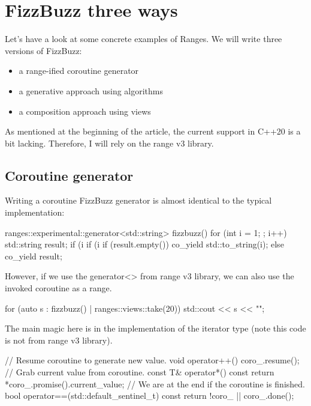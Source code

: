 \section{FizzBuzz three ways}

Let’s have a look at some concrete examples of Ranges. We will write three versions of FizzBuzz:

\begin{itemize}
    \item a range-ified coroutine generator
    \item a generative approach using algorithms
    \item a composition approach using views
\end{itemize}

As mentioned at the beginning of the article, the current support in C++20 is a bit lacking. Therefore, I will rely on the range v3 library.

\subsection{Coroutine generator}

Writing a coroutine FizzBuzz generator is almost identical to the typical implementation:

\begin{box-note}
\begin{cppcode}
ranges::experimental::generator<std::string> fizzbuzz() {
    for (int i = 1; ; i++) {
        std::string result;
        if (i %
        if (i %
        if (result.empty()) co_yield std::to_string(i);
        else co_yield result;
    }
}
\end{cppcode}
\end{box-note}

However, if we use the generator<> from range v3 library, we can also use the invoked coroutine as a range.

\begin{box-note}
\begin{cppcode}
for (auto s : fizzbuzz() | ranges::views::take(20)) {
    std::cout << s << "\n";
}
\end{cppcode}
\end{box-note}

The main magic here is in the implementation of the iterator type (note this code is not from range v3 library).

\begin{box-note}
\begin{cppcode}
// Resume coroutine to generate new value.
void operator++() { 
    coro_.resume(); 
}
// Grab current value from coroutine.
const T& operator*() const {
    return *coro_.promise().current_value;
}
// We are at the end if the coroutine is finished.
bool operator==(std::default_sentinel_t) const { 
    return !coro_ || coro_.done(); 
}
\end{cppcode}
\end{box-note}


